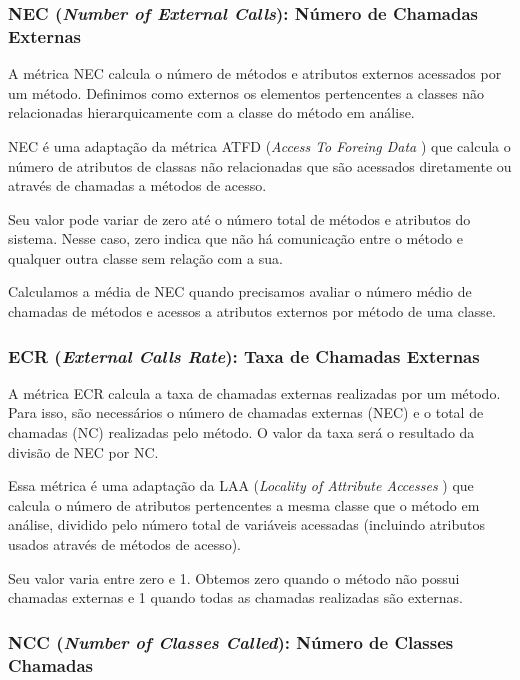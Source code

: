 \subsubsection{NEC (\textit{Number of External Calls}): Número de Chamadas Externas}

A métrica NEC calcula o número de métodos e atributos externos acessados por um método. Definimos como externos os elementos pertencentes a classes não relacionadas hierarquicamente com a classe do método em análise.
 	                                               
NEC é uma adaptação da métrica ATFD (\textit{Access To Foreing Data} \citep{Marinescu02}) que calcula o número de atributos de classas não relacionadas que são acessados diretamente ou através de chamadas a métodos de acesso. 

Seu valor pode variar de zero até o número total de métodos e atributos do sistema. Nesse caso, zero indica que não há comunicação entre o método e qualquer outra classe sem relação com a sua.
	        
Calculamos a média de NEC quando precisamos avaliar o número médio de chamadas de métodos e acessos a atributos externos por método de uma classe. 
                                                                                                           
                          
\subsubsection{ECR (\textit{External Calls Rate}): Taxa de Chamadas Externas}
                                         
A métrica ECR calcula a taxa de chamadas externas realizadas por um método. Para isso, são necessários o número de chamadas externas (NEC) e o total de chamadas (NC) realizadas pelo método. O valor da taxa será o resultado da divisão de NEC por NC.

Essa métrica é uma adaptação da LAA (\textit{Locality of Attribute Accesses} \citep{Lanza06}) que calcula o número de atributos pertencentes a mesma classe que o método em análise, dividido pelo número total de variáveis acessadas (incluindo atributos usados através de métodos de acesso). 

Seu valor varia entre zero e 1. Obtemos zero quando o método não possui chamadas externas e 1 quando todas as chamadas realizadas são externas.


\subsubsection{NCC (\textit{Number of Classes Called}): Número de Classes Chamadas}              

